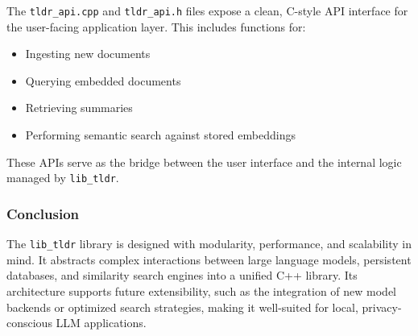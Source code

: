 The \texttt{tldr\_api.cpp} and \texttt{tldr\_api.h} files expose a clean, C-style API interface for the user-facing application layer. This includes functions for:

\begin{itemize}
    \item Ingesting new documents
    \item Querying embedded documents
    \item Retrieving summaries
    \item Performing semantic search against stored embeddings
\end{itemize}

These APIs serve as the bridge between the user interface and the internal logic managed by \texttt{lib\_tldr}.

\subsubsection{Conclusion}

The \texttt{lib\_tldr} library is designed with modularity, performance, and scalability in mind. It abstracts complex interactions between large language models, persistent databases, and similarity search engines into a unified C++ library. Its architecture supports future extensibility, such as the integration of new model backends or optimized search strategies, making it well-suited for local, privacy-conscious LLM applications.



